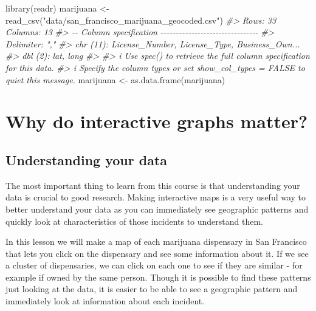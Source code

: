 \documentclass[
]{krantz}
\makeatletter
\newenvironment{Shaded}{\begin{snugshade}}{\end{snugshade}}
\newcommand{\CommentTok}[1]{\textcolor[rgb]{0.37,0.37,0.37}{\textit{#1}}}
\newcommand{\FunctionTok}[1]{\textcolor[rgb]{0,0,0}{#1}}
\newcommand{\NormalTok}[1]{#1}
\newcommand{\OtherTok}[1]{\textcolor[rgb]{0.37,0.37,0.37}{#1}}
\newcommand{\StringTok}[1]{\textcolor[rgb]{0.5,0.5,0.5}{#1}}
\newenvironment{kframe}{%
\medskip{}
\setlength{\fboxsep}{.8em}
 \def\at@end@of@kframe{}%
 \ifinner\ifhmode%
  \def\at@end@of@kframe{\end{minipage}}%
  \begin{minipage}{\columnwidth}%
 \fi\fi%
 \def\FrameCommand##1{\hskip\@totalleftmargin \hskip-\fboxsep
 \colorbox{shadecolor}{##1}\hskip-\fboxsep
     \hskip-\linewidth \hskip-\@totalleftmargin \hskip\columnwidth}%
 \MakeFramed {\advance\hsize-\width
   \@totalleftmargin\z@ \linewidth\hsize
   \@setminipage}}%
 {\par\unskip\endMakeFramed%
 \at@end@of@kframe}
\renewenvironment{Shaded}{\begin{kframe}}{\end{kframe}}
\makeatother
\begin{document}
\begin{Shaded}
\begin{Highlighting}[]
\FunctionTok{library}\NormalTok{(readr)}
\NormalTok{marijuana }\OtherTok{\textless{}{-}} \FunctionTok{read\_csv}\NormalTok{(}\StringTok{"data/san\_francisco\_marijuana\_geocoded.csv"}\NormalTok{)}
\CommentTok{\#\textgreater{} Rows: 33 Columns: 13}
\CommentTok{\#\textgreater{} {-}{-} Column specification {-}{-}{-}{-}{-}{-}{-}{-}{-}{-}{-}{-}{-}{-}{-}{-}{-}{-}{-}{-}{-}{-}{-}{-}{-}{-}{-}{-}{-}{-}{-}{-}}
\CommentTok{\#\textgreater{} Delimiter: ","}
\CommentTok{\#\textgreater{} chr (11): License\_Number, License\_Type, Business\_Own...}
\CommentTok{\#\textgreater{} dbl  (2): lat, long}
\CommentTok{\#\textgreater{} }
\CommentTok{\#\textgreater{} i Use \textasciigrave{}spec()\textasciigrave{} to retrieve the full column specification for this data.}
\CommentTok{\#\textgreater{} i Specify the column types or set \textasciigrave{}show\_col\_types = FALSE\textasciigrave{} to quiet this message.}
\NormalTok{marijuana }\OtherTok{\textless{}{-}} \FunctionTok{as.data.frame}\NormalTok{(marijuana)}
\end{Highlighting}
\end{Shaded}

\hypertarget{why-do-interactive-graphs-matter}{%
\section{Why do interactive graphs matter?}\label{why-do-interactive-graphs-matter}}

\hypertarget{understanding-your-data}{%
\subsection{Understanding your data}\label{understanding-your-data}}

The most important thing to learn from this course is that understanding your data is crucial to good research. Making interactive maps is a very useful way to better understand your data as you can immediately see geographic patterns and quickly look at characteristics of those incidents to understand them.

In this lesson we will make a map of each marijuana dispensary in San Francisco that lets you click on the dispensary and see some information about it. If we see a cluster of dispensaries, we can click on each one to see if they are similar - for example if owned by the same person. Though it is possible to find these patterns just looking at the data, it is easier to be able to see a geographic pattern and immediately look at information about each incident.
\end{document}
